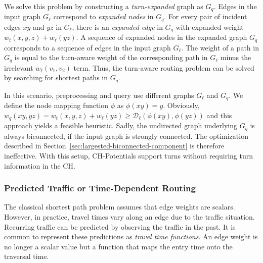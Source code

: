 \documentclass[manuscript,review]{acmart}
\newcommand*{\dist}{\mathcal{D}}
\begin{document}
We solve this problem by constructing a \emph{turn-expanded} graph as $G_q$.
Edges in the input graph $G_\ell$ correspond to \emph{expanded nodes} in $G_q$.
For every pair of incident edges $x y$ and $y z$ in $G_\ell$, there is an \emph{expanded edge} in $G_q$ with expanded weight $w_t(x,y,z) + w_\ell(y z)$.
A sequence of expanded nodes in the expanded graph $G_q$ corresponds to a sequence of edges in the input graph $G_\ell$.
The weight of a path in $G_q$ is equal to the turn-aware weight of the corresponding path in $G_\ell$ minus the irrelevant $w_\ell(v_1,v_2)$ term.
Thus, the turn-aware routing problem can be solved by searching for shortest paths in $G_q$.

In this scenario, preprocessing and query use different graphs $G_\ell$ and $G_q$.
We define the node mapping function $\phi$ as $\phi(x y) = y$.
Obviously, $w_q(xy, yz) = w_t(x,y,z) + w_\ell(y z) \geq \dist_\ell(\phi(x y), \phi(y z))$ and this approach yields a feasible heuristic.
Sadly, the undirected graph underlying $G_q$ is always biconnected, if the input graph is strongly connected.
The optimization described in Section~\ref{sec:largested-biconnected-component} is therefore ineffective.
With this setup, CH-Potentials support turns without requiring turn information in the CH.


\subsubsection{Predicted Traffic or Time-Dependent Routing}
\label{sec:predicted-traffic}

The classical shortest path problem assumes that edge weights are scalars.
However, in practice, travel times vary along an edge due to the traffic situation.
Recurring traffic can be predicted by observing the traffic in the past.
It is common \cite{bgsv-mtdtt-13,bdpw-dtdrp-16,swz-sfert-20} to represent these predictions as \emph{travel time functions}.
An edge weight is no longer a scalar value but a function that maps the entry time onto the traversal time.
\end{document}
